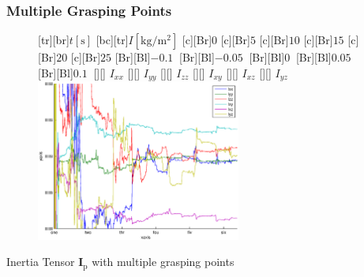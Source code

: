 \documentclass[student,noshadow]{ITRslides}
\renewcommand{\vec}[1]{\boldsymbol{#1}}
\renewcommand{\vec}[1]{\boldsymbol{#1}}
\newcommand{\scr}[1]{\mathrm{#1}}
\begin{document}
\begin{frame}
	\frametitle{Multiple Grasping Points}
	\begin{center}
		\begin{figure}
			\centering	
			[tr][br]{$t\left[\mathrm{s}\right]$}
			[bc][tr]{$I\left[\scr{kg}/\scr{m}^2\right]$}
			[c][Br]{$0$}
			[c][Br]{$5$}
			[c][Br]{$10$}
			[c][Br]{$15$}
			[c][Br]{$20$}
			[c][Br]{$25$}
			[Br][Bl]{$-0.1\  $}
			[Br][Bl]{$-0.05\ $}
			[Br][Bl]{$0\  $}
			[Br][Bl]{$0.05\  $}
			[Br][Bl]{$0.1\  $}
			[][]{\tiny \hspace{0.2cm} $I_{xx}$}
			[][]{\tiny \hspace{0.2cm} $I_{yy}$}
			[][]{\tiny \hspace{0.2cm} $I_{zz}$}
			[][]{\tiny \hspace{0.2cm} $I_{xy}$}
			[][]{\tiny \hspace{0.2cm} $I_{xz}$}
			[][]{\tiny \hspace{0.2cm} $I_{yz}$}
			\includegraphics[width=0.6\textwidth]{fig/multiple_grasping_points_human_inertias.eps}
		\end{figure}
		\vspace{0.2cm}
		Inertia Tensor $\vec{I}_\scr{p}$ with multiple grasping points
	\end{center}
\end{frame}
\end{document}
